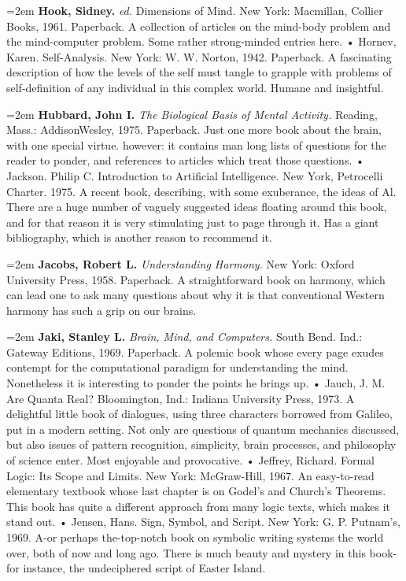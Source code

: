\par\noindent\hangindent=2em {\bf Hook, Sidney.} {\it ed.} Dimensions of Mind. New York: Macmillan, Collier Books, 1961. Paperback. A collection of articles on the mind-body problem and the mind-computer problem. Some rather strong-minded entries here. • Hornev, Karen. Self-Analysis. New York: W. W. Norton, 1942. Paperback. A fascinating description of how the levels of the self must tangle to grapple with problems of self-definition of any individual in this complex world. Humane and insightful.

\par\noindent\hangindent=2em {\bf Hubbard, John I.} {\it The Biological Basis of Mental Activity.} Reading, Mass.: AddisonWesley, 1975. Paperback. Just one more book about the brain, with one special virtue. however: it contains man long lists of questions for the reader to ponder, and references to articles which treat those questions. • Jackson. Philip C. Introduction to Artificial Intelligence. New York, Petrocelli Charter. 1975. A recent book, describing, with some exuberance, the ideas of Al. There are a huge number of vaguely suggested ideas floating around this book, and for that reason it is very stimulating just to page through it. Has a giant bibliography, which is another reason to recommend it.

\par\noindent\hangindent=2em {\bf Jacobs, Robert L.} {\it Understanding Harmony.} New York: Oxford University Press, 1958. Paperback. A straightforward book on harmony, which can lead one to ask many questions about why it is that conventional Western harmony has such a grip on our brains.

\par\noindent\hangindent=2em {\bf Jaki, Stanley L.} {\it Brain, Mind, and Computers.} South Bend. Ind.: Gateway Editions, 1969. Paperback. A polemic book whose every page exudes contempt for the computational paradigm for understanding the mind. Nonetheless it is interesting to ponder the points he brings up. • Jauch, J. M. Are Quanta Real? Bloomington, Ind.: Indiana University Press, 1973. A delightful little book of dialogues, using three characters borrowed from Galileo, put in a modern setting. Not only are questions of quantum mechanics discussed, but also issues of pattern recognition, simplicity, brain processes, and philosophy of science enter. Most enjoyable and provocative. • Jeffrey, Richard. Formal Logic: Its Scope and Limits. New York: McGraw-Hill, 1967. An easy-to-read elementary textbook whose last chapter is on Godel's and Church's Theorems. This book has quite a different approach from many logic texts, which makes it stand out. • Jensen, Hans. Sign, Symbol, and Script. New York: G. P. Putnam's, 1969. A-or perhaps the-top-notch book on symbolic writing systems the world over, both of now and long ago. There is much beauty and mystery in this book-for instance, the undeciphered script of Easter Island.

